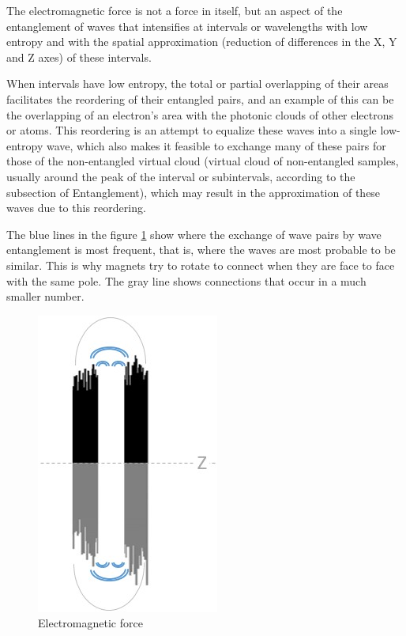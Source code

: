 The electromagnetic force is not a force in itself, but an aspect of the entanglement of waves that intensifies at intervals or wavelengths with low entropy and with the spatial approximation (reduction of differences in the X, Y and Z axes) of these intervals.

When intervals have low entropy, the total or partial overlapping of their areas facilitates the reordering of their entangled pairs, and an example of this can be the overlapping of an electron's area with the photonic clouds of other electrons or atoms. This reordering is an attempt to equalize these waves into a single low-entropy wave, which also makes it feasible to exchange many of these pairs for those of the non-entangled virtual cloud (virtual cloud of non-entangled samples, usually around the peak of the interval or subintervals, according to the subsection of Entanglement), which may result in the approximation of these waves due to this reordering.

The blue lines in the figure \ref{fig:consciousness_electromaagnetic_force} show where the exchange of wave pairs by wave entanglement is most frequent, that is, where the waves are most probable to be similar. This is why magnets try to rotate to connect when they are face to face with the same pole. The gray line shows connections that occur in a much smaller number.
	\begin{figure}[H]
	\caption{Electromagnetic force}
	\label{fig:consciousness_electromaagnetic_force}
	\centering
	\includegraphics[scale=.7]{sections/images/consciousness_electromaagnetic_force.jpg}
	\end{figure}

